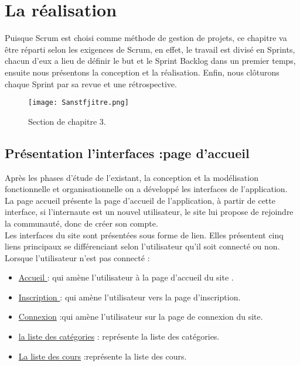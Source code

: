 \chapter{La réalisation }
\label{sec:conception}

\begin{fquote}Puisque Scrum est choisi comme méthode de gestion de projets, ce chapitre va être réparti selon
	les exigences de Scrum, en effet, le travail est divisé en Sprints, chacun d’eux a lieu de définir le but
	et le Sprint Backlog dans un premier temps, ensuite nous présentons la conception et la réalisation.
	Enfin, nous clôturons chaque Sprint par sa revue et une rétrospective.
 \end{fquote}
\begin{figure}[ht]
	\centering
	\texttt{[image: Sanstfjitre.png]}
	\caption{Section de chapitre 3.}
	\label{fig:Section de chapitre 3}
\end{figure}
\FloatBarrier
\clearpage
\section{Présentation l'interfaces :page d'accueil}
Après les phases d’étude de l’existant, la conception et la modélisation fonctionnelle et
organisationnelle on a développé les interfaces de l’application.\\
La page accueil présente la page d’accueil de l’application, à partir de cette interface, si
l’internaute est un nouvel utilisateur, le site lui propose de rejoindre la communauté, donc de
créer son compte.\\
Les interfaces du site sont présentées sous forme de lien. Elles présentent cinq liens
principaux se différenciant selon l’utilisateur qu’il soit connecté ou non. \\
{\color{cyan} Lorsque l’utilisateur n’est pas connecté  :
}

\begin{itemize}
	\item \underline{Accueil }  : qui amène l’utilisateur à la page d’accueil du site .
	\item \underline{Inscription }  : qui amène l’utilisateur vers la page d’inscription.
	\item \underline{Connexion}  :qui amène l’utilisateur sur la page de connexion du site.
	
	\item \underline{la liste des catégories}  : représente la liste des catégories.
	\item \underline{La liste des cours}  :représente la liste des cours.
\end{itemize}

